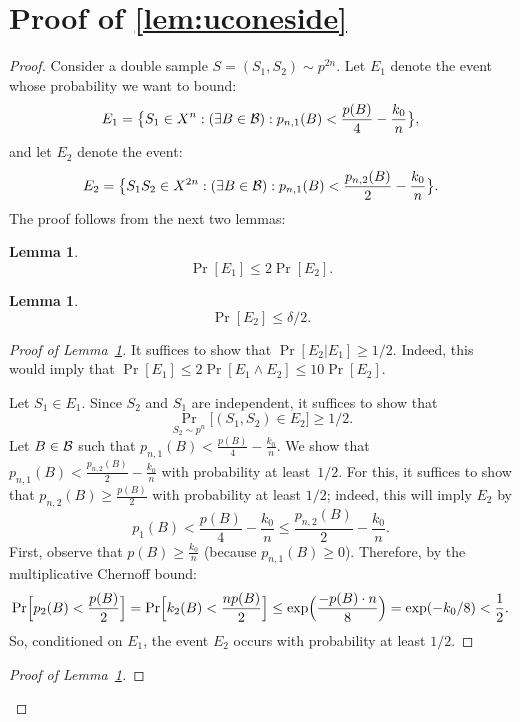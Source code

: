 \documentclass{article}
\newtheorem{lemma}[theorem]{Lemma}
\newcommand{\B}{{\cal B}}
\newcommand{\samp}{S}
\begin{document}
\section{Proof of \ref{lem:uconeside}}\label{sec:auxuc}
\begin{proof}
Consider a double sample $S=(\samp_1,\samp_2)\sim p^{2n}$.
Let $E_1$ denote the event whose probability we want to bound:
\[
E_1 = \bigl\{S_1\in X^n : (\exists B\in\B): p_{n,1}(B) < \frac{p(B)}{4} - \frac{k_0}{n} \bigr\},
\]
and let $E_2$ denote the event:
\[
E_2 = \bigl\{S_1S_2\in X^{2n} : (\exists B\in\B): p_{n,1}(B) < \frac{p_{n,2}(B)}{2} - \frac{k_0}{n} \bigr\}.
\]
The proof follows from the next two lemmas:
\begin{lemma}\label{lem:auxuc1}
\[\Pr[E_1]\leq 2\Pr[E_2].\]
\end{lemma}
\begin{lemma}\label{lem:auxuc2}
\[\Pr[E_2]\leq \delta/2.\]
\end{lemma}
\begin{proof}[Proof of Lemma~\ref{lem:auxuc1}]
It suffices to show that $\Pr[E_2 \vert E_1]\geq 1/2$.
Indeed, this would imply that 
$\Pr[E_1] \leq 2\Pr[E_1 \land E_2]\leq 10\Pr[E_2]$.

Let $S_1\in E_1$. Since $S_2$ and $S_1$ are independent,
it suffices to show that 
\[\Pr_{S_2\sim p^n}\bigl[(S_1,S_2)\in E_2\bigr] \geq 1/2.\]
Let $B\in\B$ such that $p_{n,1}(B)< \frac{p(B)}{4} - \frac{k_0}{n}$.
We show that $p_{n,1}(B) < \frac{p_{n,2}(B)}{2} - \frac{k_0}{n}$ with probability at least~$1/2$.
For this, it suffices to show that $p_{n,2}(B)\geq \frac{p(B)}{2}$ with probability at least $1/2$;
indeed, this will imply $E_2$ by
\[p_1(B) < \frac{p(B)}{4}- \frac{k_0}{n} \leq  \frac{p_{n,2}(B)}{2}- \frac{k_0}{n}.\]
First, observe that $p(B) \geq \frac{k_0}{n}$ (because $p_{n,1}(B) \geq 0$).
Therefore, by the multiplicative Chernoff bound:
\[
\Pr\Bigl[ p_2(B) < \frac{p(B)}{2}\Bigr]
=
\Pr\Bigl[ k_2(B) < \frac{np(B)}{2}\Bigr]
\leq
\exp\Bigl( \frac{-p(B)\cdot n}{8}\Bigr) = \exp(-k_0/8)< \frac{1}{2}.
\]
So, conditioned on $E_1$, 
the event $E_2$ occurs with probability at least $1/2$.


\end{proof}

\begin{proof}[Proof of Lemma~\ref{lem:auxuc2}]


\end{proof}
\end{proof}
\end{document}
